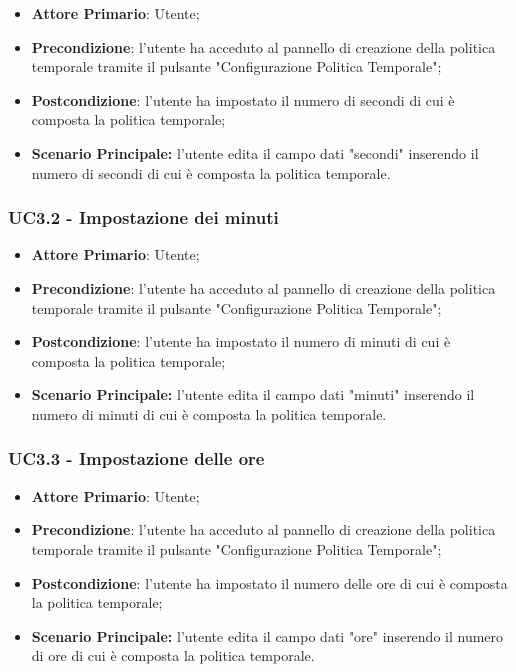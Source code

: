 \begin{itemize}
	\item \textbf{Attore Primario}: Utente;
	\item \textbf{Precondizione}: l'utente ha acceduto al pannello di creazione della politica temporale tramite il pulsante "Configurazione Politica Temporale";
	\item \textbf{Postcondizione}: l'utente ha impostato il numero di secondi di cui è composta la politica temporale;
	\item \textbf{Scenario Principale:} l'utente edita il campo dati "secondi" inserendo il numero di secondi di cui è composta la politica temporale.
\end{itemize}

\subsubsection{UC3.2 - Impostazione dei minuti}\label{UC3.2}

\begin{itemize}
	\item \textbf{Attore Primario}: Utente;
	\item \textbf{Precondizione}: l'utente ha acceduto al pannello di creazione della politica temporale tramite il pulsante "Configurazione Politica Temporale";
	\item \textbf{Postcondizione}: l'utente ha impostato il numero di minuti di cui è composta la politica temporale;
	\item \textbf{Scenario Principale:} l'utente edita il campo dati "minuti" inserendo il numero di minuti di cui è composta la politica temporale.
\end{itemize}


\subsubsection{UC3.3 - Impostazione delle ore}\label{UC3.3}

\begin{itemize}
	\item \textbf{Attore Primario}: Utente;
	\item \textbf{Precondizione}: l'utente ha acceduto al pannello di creazione della politica temporale tramite il pulsante "Configurazione Politica Temporale";
	\item \textbf{Postcondizione}: l'utente ha impostato il numero delle ore di cui è composta la politica temporale;
	\item \textbf{Scenario Principale:} l'utente edita il campo dati "ore" inserendo il numero di ore di cui è composta la politica temporale.
\end{itemize}


